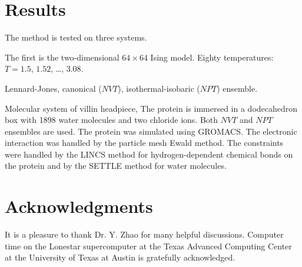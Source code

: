 \documentclass[aip,jcp,preprint,superscriptaddress]{revtex4-1}
\begin{document}
\section{Results}





The method is tested on three systems.


The first is the two-dimensional $64\times64$ Ising model.
%
Eighty temperatures: $T = 1.5$, $1.52$, \dots, $3.08$.



Lennard-Jones, canonical ($NVT$), isothermal-isobaric ($NPT$) ensemble.
%



Molecular system of villin headpiece,
The protein is immersed in
a dodecahedron box with 1898 water molecules and two chloride ions.
%
Both $NVT$ and $NPT$ ensembles are used.
%
The protein was simulated
using GROMACS\cite{
  berendsen1995, *lindahl2001, *vanderspoel2005, *hess2008}.
%
The electronic interaction was
handled by the particle mesh Ewald method\cite{
  essmann1995}.
%
The constraints were handled by the LINCS method\cite{
  hess1997}
for hydrogen-dependent chemical bonds on the protein
and by the SETTLE method\cite{
  miyamoto1992}
for water molecules.





\section{Acknowledgments}



It is a pleasure to thank Dr. Y. Zhao
for many helpful discussions.
%
Computer time on the Lonestar supercomputer
at the Texas Advanced Computing Center
at the University of Texas at Austin
is gratefully acknowledged.




\end{document}

